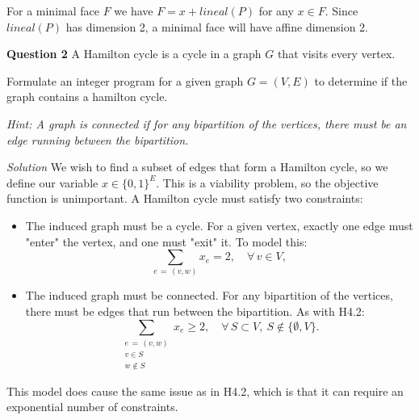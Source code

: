 \documentclass[a4paper, draft]{article}
\begin{document}
For a minimal face $F$ we have $F = x + lineal(P)$ for any $x \in F$. Since $lineal(P)$ has dimension 2, a minimal face will have affine dimension 2. \newpage

\textbf{Question 2 } A Hamilton cycle is a cycle in a graph $G$ that visits every vertex. 

Formulate an integer program for a given graph $G = (V, E)$ to determine if the graph contains a hamilton cycle. 

\textit{Hint: A graph is connected if for any bipartition of the vertices, there must be an edge running between the bipartition.} \newline\newline

\textit{Solution } We wish to find a subset of edges that form a Hamilton cycle, so we define our variable $x \in \{0, 1\}^E$. This is a viability problem, so the objective function is unimportant. A Hamilton cycle must satisfy two constraints:
\begin{itemize}
    \item The induced graph must be a cycle. For a given vertex, exactly one edge must "enter" the vertex, and one must "exit" it. To model this:
    \begin{equation*}
        \sum_{e\, =\, (v, w)} x_e = 2, \quad \forall\, v \in V,
    \end{equation*}
    \item The induced graph must be connected. For any bipartition of the vertices, there must be edges that run between the bipartition. As with H4.2:
    \begin{equation*}
        \sum_{\substack{e\, =\, (v, w) \\ v \in S \\ w \notin S}} x_e \geq 2, \quad \forall\, S \subset V,\ S \notin \{ \emptyset , V \}.
    \end{equation*}
\end{itemize}

This model does cause the same issue as in H4.2, which is that it can require an exponential number of constraints. 
\end{document}
